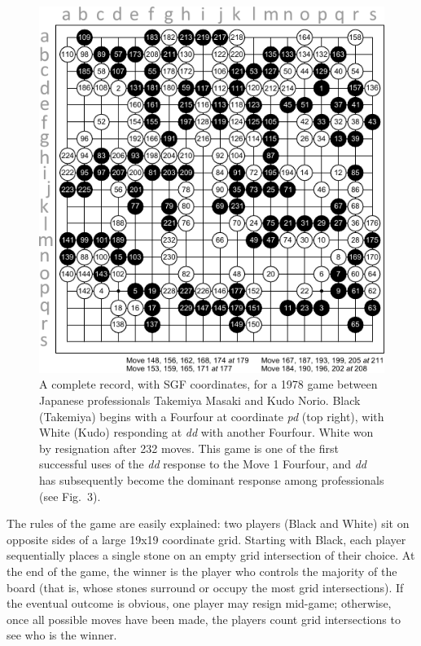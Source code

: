 \documentclass{article}
\begin{document}
\begin{figure}[t]
\begin{center} 
\includegraphics[scale=1.3]{../inputs/figKifu.pdf}
\caption{A complete record, with SGF coordinates, for a 1978 game between Japanese professionals Takemiya Masaki and Kudo Norio.  Black (Takemiya) begins with a Fourfour at coordinate \textit{pd} (top right), with White (Kudo) responding at \textit{dd} with another Fourfour.  White won by resignation after 232 moves.  This game is one of the first successful uses of the \textit{dd} response to the Move 1 Fourfour, and \textit{dd} has subsequently become the dominant response among professionals (see Fig.~3).}
\label{FigKifu}
\end{center}
\end{figure}

The rules of the game are easily explained: two players (Black and White) sit on opposite sides of a large 19x19 coordinate grid.  Starting with Black, each player sequentially places a single stone on an empty grid intersection of their choice.  At the end of the game, the winner is the player who controls the majority of the board (that is, whose stones surround or occupy the most grid intersections).  If the eventual outcome is obvious, one player may resign mid-game; otherwise, once all possible moves have been made, the players count grid intersections to see who is the winner.
\end{document}
